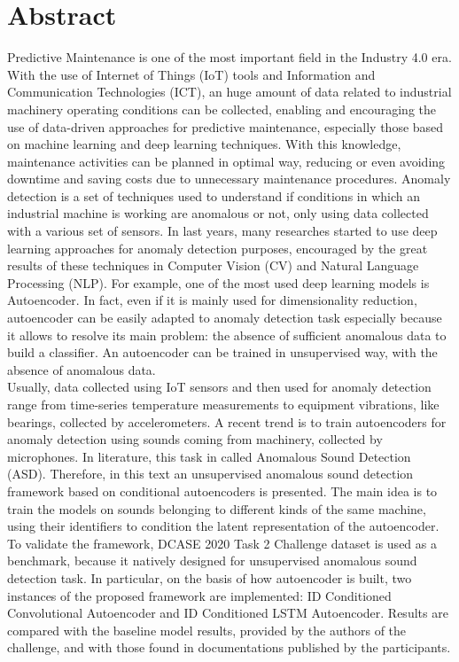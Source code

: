 \chapter{Abstract} 

Predictive Maintenance is one of the most important field in the Industry 4.0 era. With the use of Internet of Things (IoT) tools and Information and Communication Technologies (ICT), an huge amount of data related to industrial machinery operating conditions can be collected, enabling and encouraging the use of data-driven approaches for predictive maintenance, especially those based on machine learning and deep learning techniques. With this knowledge, maintenance activities can be planned in optimal way, reducing or even avoiding downtime and saving costs due to unnecessary maintenance procedures.
Anomaly detection is a set of techniques used to understand if conditions in which an industrial machine is working are anomalous or not, only using data collected with a various set of sensors. In last years, many researches started to use deep learning approaches for anomaly detection purposes, encouraged by the great results of these techniques in Computer Vision (CV) and Natural Language Processing (NLP). For example, one of the most used deep learning models is Autoencoder. In fact, even if it is mainly used for dimensionality reduction, autoencoder can be easily adapted to anomaly detection task especially because it allows to resolve its main problem: the absence of sufficient anomalous data to build a classifier. An autoencoder can be trained in unsupervised way, with the absence of anomalous data.\\ Usually, data collected using IoT sensors and then used for anomaly detection range from time-series temperature measurements to equipment vibrations, like bearings, collected by accelerometers. A recent trend is to train autoencoders for anomaly detection using sounds coming from machinery, collected by microphones. In literature, this task in called Anomalous Sound Detection (ASD). Therefore, in this text an unsupervised anomalous sound detection framework based on conditional autoencoders is presented. The main idea is to train the models on sounds belonging to different kinds of the same machine, using their identifiers to condition the latent representation of the autoencoder.\\
To validate the framework, DCASE 2020 Task 2 Challenge dataset is used as a benchmark, because it natively designed for unsupervised anomalous sound detection task. In particular, on the basis of how autoencoder is built, two instances of the proposed framework are implemented: ID Conditioned Convolutional Autoencoder and ID Conditioned LSTM Autoencoder. Results are compared with the baseline model results, provided by the authors of the challenge, and with those found in documentations published by the participants.